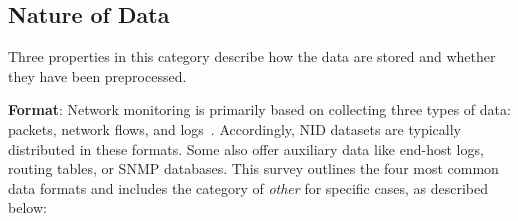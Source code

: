 \subsection{Nature of Data}
\label{ssec:dprops_data_nature}

Three properties in this category describe how the data are stored and whether they have been preprocessed.

\textbf{Format}: Network monitoring is primarily based on collecting three types of data: packets, network flows, and logs~\cite{zhou2018_survey_network_data_collection}. Accordingly, NID datasets are typically distributed in these formats. Some also offer auxiliary data like end-host logs, routing tables, or SNMP databases. This survey outlines the four most common data formats and includes the category of \emph{other} for specific cases, as described below:

